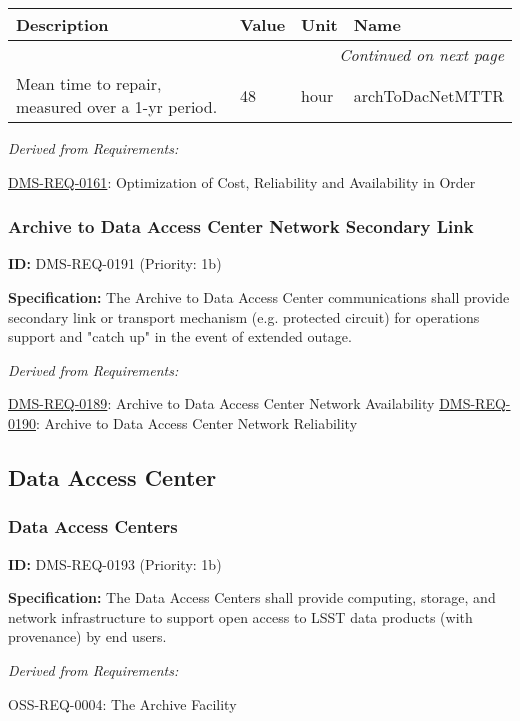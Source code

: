 \documentclass[SE,toc,lsstdraft]{lsstdoc}
\makeatletter
\newcommand{\paramname}[1]{\hspace{0pt}#1}
\newcommand{\unitname}[1]{\hspace{0pt}#1}
\newenvironment{parameters}[0]{%
\setlength\LTleft{0pt}
\setlength\LTright{\fill}
\begin{small}
\begin{longtable}[]{|p{0.49\textwidth}|l|p{0.6in}|p{1.70in}@{}|}

\hline \textbf{Description} & \textbf{Value} & \textbf{Unit} & \textbf{Name} \\ \hline
\endhead

\hline \multicolumn{4}{r}{\emph{Continued on next page}} \\
\endfoot

\hline\hline
\endlastfoot
}{%
\hline
\end{longtable}
\end{small}
}
\makeatother
\begin{document}
\begin{parameters}
Mean time to repair, measured over a 1-yr period.
&
48
&
\unitname{%
hour
}
&
\paramname{%
archToDacNetMTTR
} \\\hline
\end{parameters}

\emph{Derived from Requirements:}

\hyperref[DMS-REQ-0161]{DMS-REQ-0161}:
Optimization of Cost, Reliability and Availability in Order \newline

\subsubsection{Archive to Data Access Center Network Secondary Link}

\label{DMS-REQ-0191}
\textbf{ID:} DMS-REQ-0191 (Priority: 1b)

\textbf{Specification: }The Archive to Data Access Center communications shall provide secondary link or transport mechanism (e.g. protected circuit) for operations support and "catch up" in the event of extended outage.

\emph{Derived from Requirements:}

\hyperref[DMS-REQ-0189]{DMS-REQ-0189}:
Archive to Data Access Center Network Availability \newline
\hyperref[DMS-REQ-0190]{DMS-REQ-0190}:
Archive to Data Access Center Network Reliability \newline

\subsection{Data Access Center}

\subsubsection{Data Access Centers}

\label{DMS-REQ-0193}
\textbf{ID:} DMS-REQ-0193 (Priority: 1b)

\textbf{Specification:} The Data Access Centers shall provide computing, storage, and network infrastructure to support open access to LSST data products (with provenance) by end users.

\emph{Derived from Requirements:}

OSS-REQ-0004:
The Archive Facility \newline
\end{document}
